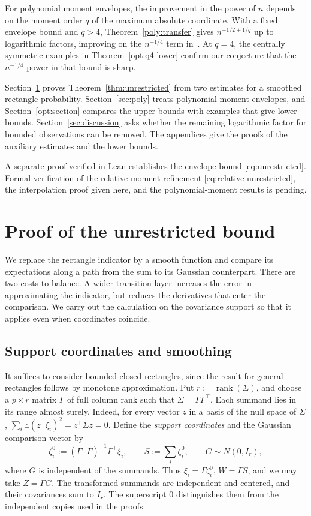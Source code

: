 \documentclass[11pt,letterpaper]{article}
\theoremstyle{remark}
\newcommand{\E}{\mathbb E}
\begin{document}
For polynomial moment envelopes, the improvement in the power of \(n\)
depends on the moment order \(q\) of the maximum absolute coordinate.
With a fixed envelope bound and \(q>4\), Theorem~\ref{poly:transfer}
gives \(n^{-1/2+1/q}\) up to logarithmic factors, improving on the
\(n^{-1/4}\) term in~\cite[Theorem~2.5]{CCKK2022}. At \(q=4\),
the centrally symmetric examples in Theorem~\ref{opt:q4-lower}
confirm our conjecture that the \(n^{-1/4}\) power in that bound is sharp.

Section~\ref{sec:smoothing} proves Theorem~\ref{thm:unrestricted} from
two estimates for a smoothed rectangle probability.
Section~\ref{sec:poly} treats polynomial moment envelopes, and
Section~\ref{opt:section} compares the upper bounds with examples that
give lower bounds. Section~\ref{sec:discussion} asks whether the remaining
logarithmic factor for bounded observations can be removed. The appendices
give the proofs of the auxiliary estimates and the lower bounds.

A separate proof verified in Lean establishes the envelope bound \eqref{eq:unrestricted}. Formal verification of the relative-moment refinement \eqref{eq:relative-unrestricted}, the interpolation proof given here, and the polynomial-moment results is pending.

\section{Proof of the unrestricted bound}\label{sec:smoothing}
We replace the rectangle indicator by a smooth function and compare its
expectations along a path from the sum to its Gaussian counterpart.
There are two costs to balance. A wider transition layer increases the
error in approximating the indicator, but reduces the derivatives that
enter the comparison. We carry out the calculation on the covariance
support so that it applies even when coordinates coincide.

\subsection{Support coordinates and smoothing}\label{sec:outline-smoothing}
It suffices to consider bounded closed rectangles, since the result for
general rectangles follows by monotone approximation. Put
\(r:=\operatorname{rank}(\Sigma)\), and choose a \(p\times r\) matrix
\(\Gamma\) of full column rank such that \(\Sigma=\Gamma\Gamma^\top\).
Each summand lies in its range almost surely. Indeed, for every vector
\(z\) in a basis of the null space of \(\Sigma\),
\(\sum_i\E(z^\top\xi_i)^2=z^\top\Sigma z=0\). Define the
\emph{support coordinates} and the Gaussian comparison vector by
\[
 \zeta_i^0:=(\Gamma^\top\Gamma)^{-1}\Gamma^\top\xi_i,\qquad
 S:=\sum_i\zeta_i^0,\qquad G\sim N(0,I_r),
\]
where \(G\) is independent of the summands. Thus \(\xi_i=\Gamma\zeta_i^0\),
\(W=\Gamma S\), and we may take \(Z=\Gamma G\).
The transformed summands are independent and centered, and their
covariances sum to \(I_r\). The superscript \(0\) distinguishes them
from the independent copies used in the proofs.
\end{document}
